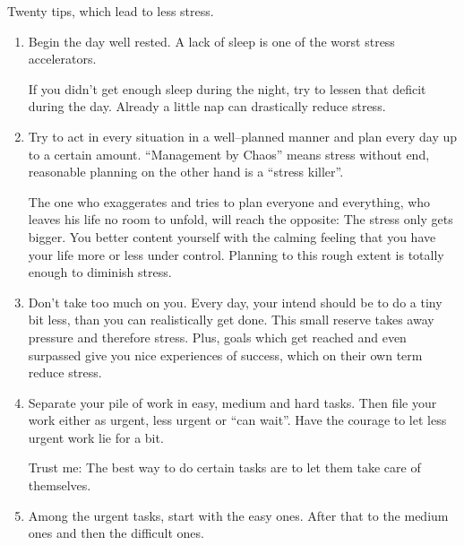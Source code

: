 \documentclass[../main.tex]{subfiles}
\begin{document}
Twenty tips, which lead to less stress.
\begin{enumerate}
\item Begin the day well rested. A  lack of sleep is one of the worst stress accelerators. 

If you didn't get enough sleep during the night, try to lessen that deficit during the day. Already a little nap can drastically reduce stress.
\item Try to act in every situation in a well--planned manner and plan every day up to a certain amount.
``Management by Chaos'' means stress without end, reasonable planning on the other hand is a ``stress killer''.

The one who exaggerates and tries to plan everyone and everything, who leaves his life no room to unfold, will reach the opposite: The stress only gets bigger. You better content yourself with the calming feeling that you have your life more or less under control. Planning to this rough extent is totally enough to diminish stress.
\item Don't take too much on you. Every day, your intend should  be to do a tiny bit less, than you can realistically get done. This small reserve takes away pressure and therefore stress. Plus, goals which get reached and even surpassed give you nice experiences of success, which on their own term reduce stress.
\item Separate your pile of work in easy, medium and hard tasks. Then file your work either as urgent, less urgent or ``can wait''. Have the courage to let less urgent work lie for a bit. 

Trust me: The best way to do certain tasks are to let them take care of themselves.
\item Among the urgent tasks, start with the easy ones. After that to the medium ones and then the difficult ones.


\end{enumerate}
\end{document}
